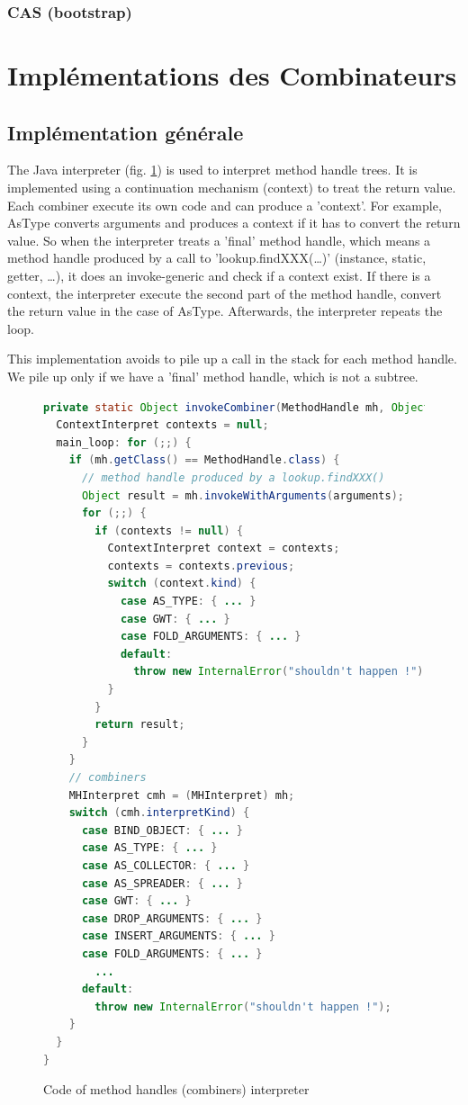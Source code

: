 \documentclass{sigplanconf}
\begin{document}
    \subsubsection{CAS (bootstrap)}

\section{Impl\'ementations des Combinateurs}

  \subsection{Impl\'ementation g\'en\'erale}
    The Java interpreter (fig. \ref{intepret}) is used to interpret method handle trees.
    It is implemented using a continuation mechanism (context) to treat the return value.
    Each combiner execute its own code and can produce a 'context'.
    For example, AsType converts arguments and produces a context if it has to convert the return value.
    So when the interpreter treats a 'final' method handle,
    which means a method handle produced by a call to 'lookup.findXXX(\dots)' (instance, static, getter, \dots),
    it does an invoke-generic and check if a context exist.
    If there is a context, the interpreter execute the second part of the method handle,
    convert the return value in the case of AsType.
    Afterwards, the interpreter repeats the loop.
    
    This implementation avoids to pile up a call in the stack for each method handle.
    We pile up only if we have a 'final' method handle, which is not a subtree.

    \begin{figure}[!h]
      \begin{lstlisting}[language=Java]
private static Object invokeCombiner(MethodHandle mh, Object[] arguments) throws Throwable {
  ContextInterpret contexts = null;
  main_loop: for (;;) {
    if (mh.getClass() == MethodHandle.class) {
      // method handle produced by a lookup.findXXX()
      Object result = mh.invokeWithArguments(arguments);
      for (;;) {
        if (contexts != null) {
          ContextInterpret context = contexts;
          contexts = contexts.previous;
          switch (context.kind) {
            case AS_TYPE: { ... }
            case GWT: { ... }
            case FOLD_ARGUMENTS: { ... }
            default:
              throw new InternalError("shouldn't happen !");
          }
        }
        return result;
      }
    }
    // combiners
    MHInterpret cmh = (MHInterpret) mh;
    switch (cmh.interpretKind) {
      case BIND_OBJECT: { ... }
      case AS_TYPE: { ... }
      case AS_COLLECTOR: { ... }
      case AS_SPREADER: { ... }
      case GWT: { ... }
      case DROP_ARGUMENTS: { ... }
      case INSERT_ARGUMENTS: { ... }
      case FOLD_ARGUMENTS: { ... }
        ...
      default:
        throw new InternalError("shouldn't happen !");
    }
  }
}
      \end{lstlisting}
      \caption{Code of method handles (combiners) interpreter}
      \label{intepret}
    \end{figure}
\end{document}

